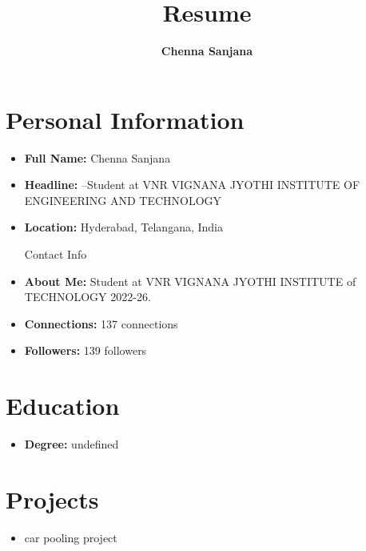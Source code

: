 \documentclass[a4paper, 12pt]{article}
\begin{document}
    \title{\textbf{Resume}}
    \author{\textbf{Chenna Sanjana}}
    \date{}
    \maketitle


    \section*{Personal Information}
    \begin{itemize}
        \item \textbf{Full Name:} Chenna Sanjana
        \item \textbf{Headline:} --Student at VNR VIGNANA JYOTHI INSTITUTE OF ENGINEERING AND TECHNOLOGY
        \item \textbf{Location:} Hyderabad, Telangana, India
          
            Contact Info
        \item \textbf{About Me:} Student at VNR VIGNANA JYOTHI INSTITUTE of TECHNOLOGY 2022-26.
        \item \textbf{Connections:} 137 connections
        \item \textbf{Followers:} 139 followers
    \end{itemize}

    \section*{Education}
    \begin{itemize}
        \item \textbf{Degree:} undefined
    \end{itemize}

    \section*{Projects}
    \begin{itemize}
        \item car pooling project
    \end{itemize}
\end{document}
